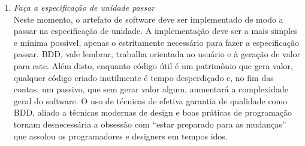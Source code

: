 \documentclass[a4paper,abntfigtabnum,noindentfirst]{abnt}
\begin{document}
\begin{enumerate}
\item \textit{Faça a especificação de unidade passar}\\
Neste momento, o artefato de software deve ser implementado de modo a passar na especificação de unidade. A implementação deve ser a mais simples e mínima possível, apenas o estritamente necessário para fazer a especificação passar. BDD, vale lembrar, trabalha orientada ao usuário e à geração de valor para este. Além disto, enquanto código útil é um patrimônio que gera valor, qualquer código criado inutilmente é tempo desperdiçado e, no fim das contas, um passivo, que sem gerar valor algum, aumentará a complexidade geral do software. O uso de técnicas de efetiva garantia de qualidade como BDD, aliado a técnicas modernas de design e boas práticas de programação \cite{CleanCode} \cite{ImplementationPatterns} tornam desnecessária a obsessão com ``estar preparado para as mudanças'' que assolou os programadores e designers em tempos idos.


\end{enumerate}
\end{document}
